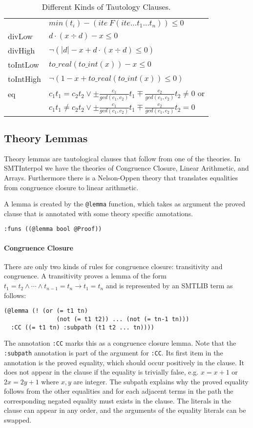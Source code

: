 \documentclass[a4paper]{article}
\newcommand\si{SMTInterpol\xspace}
\begin{document}
\begin{table}[htbp]
\begin{tabular}{l|l}
     & $min(t_i) -(ite\ F (ite \dots t_1 \dots t_n)) \leq 0$\\
    divLow & $d\cdot (x\div d) - x \leq 0$\\
    divHigh & $\neg (|d| - x + d\cdot (x\div d)\leq 0)$\\
    toIntLow & $to\_real(to\_int(x)) - x \leq 0$\\
    toIntHigh & $\neg (1 - x + to\_real(to\_int(x))\leq 0)$\\
    eq & $c_1t_1=c_2t_2\lor
    \pm\frac{c_1}{gcd(c_1,c_2)}t_1\mp\frac{c_2}{gcd(c_1,c_2)}t_2\neq 0$ or\\
    &$c_1t_1\neq c_2t_2\lor \pm\frac{c_1}{gcd(c_1,c_2)}t_1\mp\frac{c_2}{gcd(c_1,c_2)}t_2=0$
  \end{tabular}
  \caption{\label{tab:tautforms}Different Kinds of Tautology Clauses.}
\end{table}

\subsection{Theory Lemmas}
Theory lemmas are tautological clauses that follow from one of the
theories.  In \si we have the theories of Congruence Closure, Linear
Arithmetic, and Arrays.  Furthermore there is a Nelson-Oppen theory
that translates equalities from congruence closure to linear
arithmetic.

A lemma is created by the \verb+@lemma+ function, which takes as
argument the proved clause that is annotated with some theory specific
annotations.
\begin{verbatim}
:funs ((@lemma bool @Proof))
\end{verbatim}

\paragraph{Congruence Closure}

There are only two kinds of rules for congruence closure: transitivity
and congruence.  A transitivity proves a lemma of the form ${t_1 = t_2}
\land \cdots\land {t_{n-1}= t_n} \rightarrow {t_1 = t_n}$ and is
represented by an SMTLIB term as follows:

\begin{verbatim}
(@lemma (! (or (= t1 tn)
               (not (= t1 t2)) ... (not (= tn-1 tn)))
  :CC ((= t1 tn) :subpath (t1 t2 ... tn))))
\end{verbatim}

The annotation \verb+:CC+ marks this as a congruence closure lemma.
Note that the \verb+:subpath+ annotation is part of the argument for
\verb+:CC+.  Its first item in the annotation is the proved equality,
which should occur positively in the clause.  It does not appear in
the clause if the equality is trivially false, e.g. $x = x+1$ or $2x =
2y+1$ where $x,y$ are integer.  The subpath explains why the proved
equality follows from the other equalities and for each adjacent terms
in the path the corresponding negated equality must exists in the
clause.  The literals in the clause can appear in any order, and the
arguments of the equality literals can be swapped.
\end{document}
